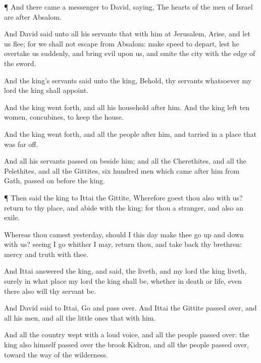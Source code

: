 {\par }{\PP {}¶ And there
came a
messenger to
David,
saying, The
hearts of the
men of
Israel are
after
Absalom.

And
David
said unto all his
servants that
{} with him at
Jerusalem,
Arise, and let us
flee; for we shall not
{}
escape
from
Absalom: make
speed to
depart, lest he
overtake us
suddenly, and
bring
evil upon us, and
smite the
city with the
edge of the
sword.

And the
king’s
servants
said unto the
king, Behold, thy
servants
{} whatsoever my
lord the
king shall
appoint.

And the
king went
forth, and all his
household
after him. And the
king
left
ten
women,
{}
concubines, to
keep the
house.

And the
king went
forth, and all the
people
after him, and
tarried in a
place that was far
off.

And all his
servants passed
on
beside him; and all the
Cherethites, and all the
Pelethites, and all the
Gittites,
six
hundred
men which
came
after him from
Gath, passed
on
before the
king.


\par }{\PP {}¶ Then
said the
king to
Ittai the
Gittite, Wherefore
goest thou also with us?
return to thy
place, and
abide with the
king: for thou
{} a
stranger, and also an
exile.

Whereas thou
camest
{}
yesterday, should I this
day make thee
go up and
down with us? seeing I
go whither I may,
return thou, and take
back thy
brethren:
mercy and
truth
{} with thee.

And
Ittai
answered the
king, and
said,
{} the
{}
liveth, and
{} my
lord the
king
liveth, surely in what
place my
lord the
king shall be, whether in
death or
life, even there also will thy
servant be.

And
David
said to
Ittai,
Go and pass
over. And
Ittai the
Gittite passed
over, and all his
men, and all the little
ones that
{} with him.

And all the
country
wept with a
loud
voice, and all the
people passed
over: the
king also himself passed
over the
brook
Kidron, and all the
people passed
over,
toward the
way of the
wilderness.


}
